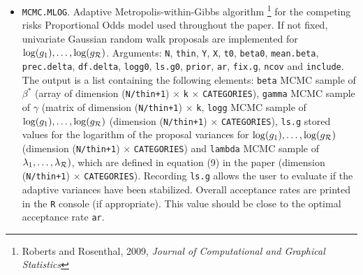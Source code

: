 \documentclass[a4paper,11pt]{article}
\theoremstyle{example}
\theoremstyle{theorem}
\theoremstyle{theorem}
\theoremstyle{proposition}
\theoremstyle{corollary}
\begin{document}
\begin{itemize}
\item \texttt{MCMC.MLOG}. Adaptive Metropolis-within-Gibbs algorithm  \footnote{Roberts and Rosenthal, 2009, {\it Journal of Computational and Graphical Statistics}} for the competing risks Proportional Odds model used throughout the paper. If not fixed, univariate Gaussian random walk proposals are implemented for $\log(g_1),\ldots,\log(g_{\cal R})$. Arguments: \texttt{N}, \texttt{thin}, \texttt{Y}, \texttt{X}, \texttt{t0}, \texttt{beta0}, \texttt{mean.beta}, \texttt{prec.delta}, \texttt{df.delta}, \texttt{logg0}, \texttt{ls.g0}, \texttt{prior}, \texttt{ar}, \texttt{fix.g}, \texttt{ncov} and \texttt{include}. The output is a list containing the following elements: \texttt{beta} MCMC sample of $\beta^*$ (array of dimension (\texttt{N/thin+1}) $\times$ \texttt{k} $\times$ \texttt{CATEGORIES}), \texttt{gamma} MCMC sample of $\gamma$ (matrix of dimension (\texttt{N/thin+1}) $\times$ \texttt{k}, \texttt{logg} MCMC sample of $\log(g_1),\ldots,\log(g_{\cal R})$ (dimension (\texttt{N/thin+1}) $\times$ \texttt{CATEGORIES}), \texttt{ls.g} stored values for the logarithm of the proposal variances for $\log(g_1),\ldots,\log(g_{\cal R})$ (dimension (\texttt{N/thin+1}) $\times$ \texttt{CATEGORIES}) and \texttt{lambda} MCMC sample of $\lambda_1,\ldots,\lambda_{\cal R})$, which are defined in equation (9) in the paper (dimension (\texttt{N/thin+1}) $\times$ \texttt{CATEGORIES}). Recording \texttt{ls.g} allows the user to evaluate if the adaptive variances have been stabilized. Overall acceptance rates are printed in the \texttt{R} console (if appropriate). This value should be close to the optimal acceptance rate \texttt{ar}.
\end{itemize}
\end{document}

